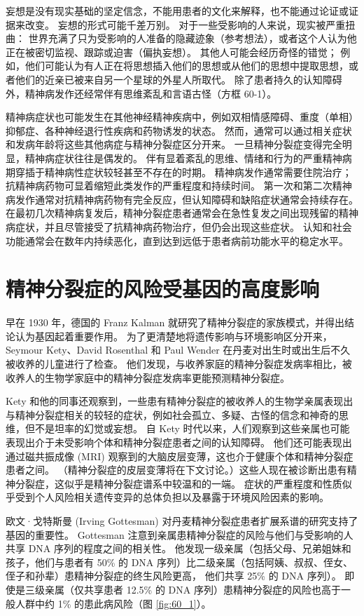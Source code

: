 妄想是没有现实基础的坚定信念，不能用患者的文化来解释，也不能通过论证或证据来改变。
妄想的形式可能千差万别。 对于一些受影响的人来说，现实被严重扭曲：
世界充满了只为受影响的人准备的隐藏迹象（参考想法），或者这个人认为他正在被密切监视、跟踪或迫害（偏执妄想）。
其他人可能会经历奇怪的错觉；
例如，他们可能认为有人正在将思想插入他们的思想或从他们的思想中提取思想，或者他们的近亲已被来自另一个星球的外星人所取代。
除了患者持久的认知障碍外，精神病发作还经常伴有思维紊乱和言语古怪（方框 60-1）。


精神病症状也可能发生在其他神经精神疾病中，例如双相情感障碍、重度（单相）抑郁症、各种神经退行性疾病和药物诱发的状态。
然而，通常可以通过相关症状和发病年龄将这些其他病症与精神分裂症区分开来。
一旦精神分裂症变得完全明显，精神病症状往往是偶发的。
伴有显着紊乱的思维、情绪和行为的严重精神病期穿插于精神病性症状较轻甚至不存在的时期。
精神病发作通常需要住院治疗；
抗精神病药物可显着缩短此类发作的严重程度和持续时间。
第一次和第二次精神病发作通常对抗精神病药物有完全反应，但认知障碍和缺陷症状通常会持续存在。
在最初几次精神病复发后，精神分裂症患者通常会在急性复发之间出现残留的精神病症状，并且尽管接受了抗精神病药物治疗，但仍会出现这些症状。
认知和社会功能通常会在数年内持续恶化，直到达到远低于患者病前功能水平的稳定水平。



\section{精神分裂症的风险受基因的高度影响}
早在 1930 年，德国的 Franz Kalman 就研究了精神分裂症的家族模式，并得出结论认为基因起着重要作用。 为了更清楚地将遗传影响与环境影响区分开来，Seymour Kety、David Rosenthal 和 Paul Wender 在丹麦对出生时或出生后不久被收养的儿童进行了检查。 他们发现，与收养家庭的精神分裂症发病率相比，被收养人的生物学家庭中的精神分裂症发病率更能预测精神分裂症。

Kety 和他的同事还观察到，一些患有精神分裂症的被收养人的生物学亲属表现出与精神分裂症相关的较轻的症状，例如社会孤立、多疑、古怪的信念和神奇的思维，但不是坦率的幻觉或妄想。 自 Kety 时代以来，人们观察到这些亲属也可能表现出介于未受影响个体和精神分裂症患者之间的认知障碍。 他们还可能表现出通过磁共振成像 (MRI) 观察到的大脑皮层变薄，这也介于健康个体和精神分裂症患者之间。 （精神分裂症的皮层变薄将在下文讨论。）这些人现在被诊断出患有精神分裂症，这似乎是精神分裂症谱系中较温和的一端。 症状的严重程度和性质似乎受到个人风险相关遗传变异的总体负担以及暴露于环境风险因素的影响。

欧文·戈特斯曼 (Irving Gottesman) 对丹麦精神分裂症患者扩展系谱的研究支持了基因的重要性。 Gottesman 注意到亲属患精神分裂症的风险与他们与受影响的人共享 DNA 序列的程度之间的相关性。 他发现一级亲属（包括父母、兄弟姐妹和孩子，他们与患者有 50\% 的 DNA 序列）比二级亲属（包括阿姨、叔叔、侄女、侄子和孙辈）患精神分裂症的终生风险更高， 他们共享 25\% 的 DNA 序列）。 即使是三级亲属（仅共享患者 12.5\% 的 DNA 序列）患精神分裂症的风险也高于一般人群中约 1\% 的患此病风险（图 \ref{fig:60_1}）。

